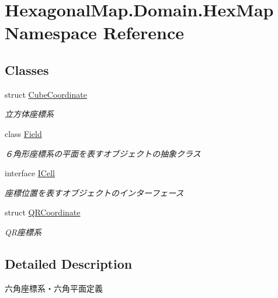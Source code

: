 \hypertarget{namespace_hexagonal_map_1_1_domain_1_1_hex_map}{}\section{Hexagonal\+Map.\+Domain.\+Hex\+Map Namespace Reference}
\label{namespace_hexagonal_map_1_1_domain_1_1_hex_map}
\subsection*{Classes}
\begin{DoxyCompactItemize}
\item 
struct \mbox{\hyperlink{struct_hexagonal_map_1_1_domain_1_1_hex_map_1_1_cube_coordinate}{Cube\+Coordinate}}
\begin{DoxyCompactList}\small\item\em 立方体座標系 \end{DoxyCompactList}\item 
class \mbox{\hyperlink{class_hexagonal_map_1_1_domain_1_1_hex_map_1_1_field}{Field}}
\begin{DoxyCompactList}\small\item\em ６角形座標系の平面を表すオブジェクトの抽象クラス \end{DoxyCompactList}\item 
interface \mbox{\hyperlink{interface_hexagonal_map_1_1_domain_1_1_hex_map_1_1_i_cell}{I\+Cell}}
\begin{DoxyCompactList}\small\item\em 座標位置を表すオブジェクトのインターフェース \end{DoxyCompactList}\item 
struct \mbox{\hyperlink{struct_hexagonal_map_1_1_domain_1_1_hex_map_1_1_q_r_coordinate}{Q\+R\+Coordinate}}
\begin{DoxyCompactList}\small\item\em Q\+R座標系 \end{DoxyCompactList}\end{DoxyCompactItemize}


\subsection{Detailed Description}
六角座標系・六角平面定義 